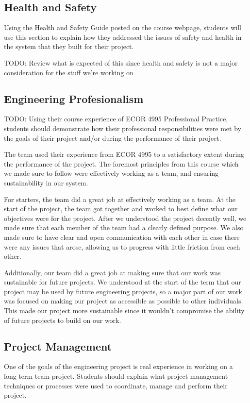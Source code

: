 \documentclass[titlepage]{article}
\begin{document}
\subsection{Health and Safety}
Using the Health and Safety Guide posted on the course webpage, students will use this section to explain how they addressed the issues of safety and health in the system that they built for their project.

TODO: Review what is expected of this since health and safety is not a major consideration for the stuff we're working on

\subsection{Engineering Profesionalism}
TODO: Using their course experience of ECOR 4995 Professional Practice, students should demonstrate how their professional responsibilities were met by the goals of their project and/or during the performance of their project.

The team used their experience from ECOR 4995 to a satisfactory extent during the performance of the project. The foremost principles from this course which we made sure to follow were effectively working as a team, and ensuring sustainability in our system.

For starters, the team did a great job at effectively working as a team. At the start of the project, the team got together and worked to best define what our objectives were for the project. After we understood the project decently well, we made sure that each member of the team had a clearly defined purpose. We also made sure to have clear and open communication with each other in case there were any issues that arose, allowing us to progress with little friction from each other.

Additionally, our team did a great job at making sure that our work was sustainable for future projects. We understood at the start of the term that our project may be used by future engineering projects, so a major part of our work was focused on making our project as accessible as possible to other individuals. This made our project more sustainable since it wouldn't compromise the ability of future projects to build on our work.

\subsection{Project Management}
One of the goals of the engineering project is real experience in working on a long-term team project. Students should explain what project management techniques or processes were used to coordinate, manage and perform their project.
\end{document}
